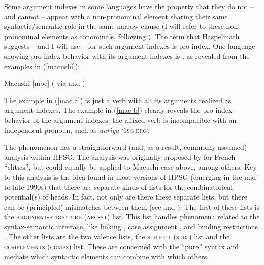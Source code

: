\documentclass[output=paper]{langsci/langscibook}
\begin{document}
{Some argument indexes in some languages have the property that they do not -- and cannot -- appear with a non-pronominal element sharing their same syntactic/semantic role in the same narrow clause (I will refer to these non-pronominal elements as conominals, following \citealt{haspelmath13}). The term that Haspelmath suggests -- and I will use -- for such argument indexes is pro-index. One language showing pro-index behavior with its argument indexes is , as revealed from the examples in (\ref{macushi}): 
%
\begin{samepage}
\begin{exe}
\ex \label{macushi} Macushi [mbc] (\citealt{abbott91} via \citealt{siewierska99} and \citealt{corbett03}) \nopagebreak[4]
\begin{xlist}
\end{xlist}
\end{exe}
\end{samepage}
The example in (\ref{mac a}) is just a verb with all its arguments realized as argument indexes. The example in (\ref{mac b}) clearly reveals the pro-index behavior of the argument indexes: the affixed verb is incompatible with an independent pronoun, such as \textit{uur\^{\i}ya} `\textsc{1sg.erg}'. 

The  phenomenon has a straightforward (and, as a result, commonly assumed) analysis within HPSG. The analysis was originally proposed by \citet{MS97a-u} for French ``clitics'', but could equally be applied to Macushi case above, among others. Key to this analysis is the idea found in most versions of HPSG (emerging in the mid-to-late 1990s) that there are separate kinds of lists for the combinatorical potential(s) of heads. In fact, not only are there these separate lists, but there can be (principled) mismatches between them (see  and ). The first of these lists is the \textsc{argument-structure} (\textsc{arg-st}) list. This list handles phenomena related to the syntax-semantic interface, like linking \citep{Davis2001a-u}, case assignment \citep{Prze99b}, and binding restrictions \citep{mannsag98,wecharka98}. The other lists are the two valence lists, the \textsc{subject} (\textsc{subj}) list and the \textsc{complements} (\textsc{comps}) list. These are concerned with the ``pure'' syntax and mediate which syntactic elements can combine with which others.

}
\end{document}
